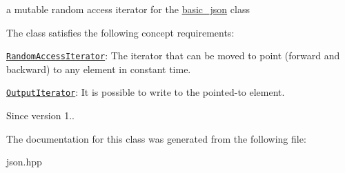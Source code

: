 a mutable random access iterator for the \hyperlink{classnlohmann_1_1basic__json}{basic\+\_\+json} class 

The class satisfies the following concept requirements\+:
\begin{DoxyItemize}
\item \href{http://en.cppreference.com/w/cpp/concept/RandomAccessIterator}{\tt Random\+Access\+Iterator}\+: The iterator that can be moved to point (forward and backward) to any element in constant time.
\item \href{http://en.cppreference.com/w/cpp/concept/OutputIterator}{\tt Output\+Iterator}\+: It is possible to write to the pointed-\/to element.
\end{DoxyItemize}

\begin{DoxySince}{Since}
version 1.. 
\end{DoxySince}


The documentation for this class was generated from the following file\+:\begin{DoxyCompactItemize}
\item 
json.\+hpp\end{DoxyCompactItemize}
